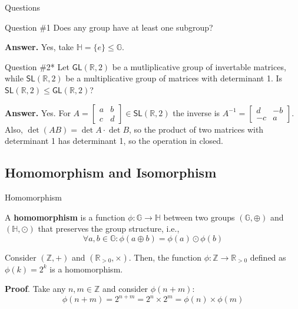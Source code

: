 \documentclass{beamer}
\begin{document}
  \begin{frame}{Questions}
    \begin{alertblock}{Question \#1}
      Does any group have at least one subgroup?
    \end{alertblock}
    \pause

    \textbf{Answer.} Yes, take $\mathbb{H} = \{e\} \leq \mathbb{G}$.

    \begin{alertblock}{Question \#2*}
      Let $\mathsf{GL}(\mathbb{R},2)$ be a mutliplicative group of invertable matrices, while $\mathsf{SL}(\mathbb{R},2)$ be a multiplicative group of matrices with determinant 1. Is $\mathsf{SL}(\mathbb{R},2) \leq \mathsf{GL}(\mathbb{R},2)$?
    \end{alertblock}
    \pause

    \textbf{Answer.} Yes. For $A = \begin{bmatrix}
      a & b \\
      c & d
    \end{bmatrix} \in \mathsf{SL}(\mathbb{R},2)$ the inverse is $A^{-1} = \begin{bmatrix}
      d & -b \\ -c & a
    \end{bmatrix}$. Also, $\det (AB) = \det A \cdot \det B$, so the product of two matrices with determinant 1 has determinant 1, so the operation in closed.
  \end{frame}

  \subsection{Homomorphism and Isomorphism}

  \begin{frame}{Homomorphism}
    \begin{definition}
      A \textbf{homomorphism} is a function $\phi: \mathbb{G} \rightarrow \mathbb{H}$ between two groups $(\mathbb{G}, \oplus)$ and $(\mathbb{H}, \odot)$ that preserves the group structure, i.e., 
      \begin{equation*}
        \forall a,b \in \mathbb{G}: \phi(a \oplus b) = \phi(a) \odot \phi(b)
      \end{equation*}
    \end{definition}
    \pause

    \begin{example}
      Consider $(\mathbb{Z}, +)$ and $(\mathbb{R}_{>0}, \times)$. Then, the function $\phi: \mathbb{Z} \rightarrow \mathbb{R}_{>0}$ defined as $\phi(k) = 2^k$ is a homomorphism.
    \end{example}

    \textbf{Proof}. Take any $n,m \in \mathbb{Z}$ and consider $\phi(n+m)$:
    \begin{equation*}
      \phi(n+m) = 2^{n+m} = 2^n \times 2^m = \phi(n) \times \phi(m)
    \end{equation*}
  \end{frame}
\end{document}
